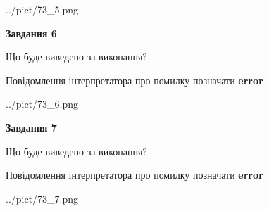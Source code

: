 \documentclass[10pt, ukrainian]{article}
\begin{document}
{\begin {large}
\begin{center}
	{../pict/73_5.png}
\end{center}
\newpage

{\begin {center}\textbf{Завдання 6}\end {center}}\par
Що буде виведено за виконання? \par
Повідомлення інтерпретатора про помилку позначати \textbf{error}

\begin{center}
	{../pict/73_6.png}
\end{center}
\newpage

{\begin {center}\textbf{Завдання 7}\end {center}}\par
Що буде виведено за виконання? \par
Повідомлення інтерпретатора про помилку позначати \textbf{error}

\begin{center}
	{../pict/73_7.png}
\end{center}
\newpage

\end {large}}
\end{document}
